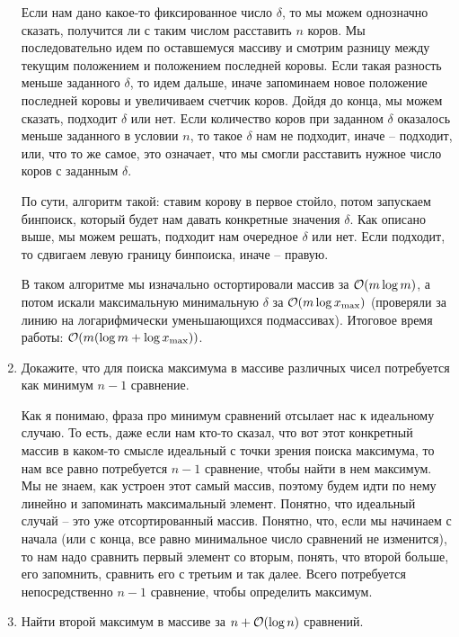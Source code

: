 \begin{enumerate}
\begin{solution}
		Если нам дано какое-то фиксированное число $\delta$, то мы можем однозначно сказать, получится ли с таким числом расставить $n$ коров. Мы последовательно идем по оставшемуся массиву и смотрим разницу между текущим положением и положением последней коровы. Если такая разность меньше заданного $\delta$, то идем дальше, иначе запоминаем новое положение последней коровы и увеличиваем счетчик коров. Дойдя до конца, мы можем сказать, подходит $\delta$ или нет. Если количество коров при заданном $\delta$ оказалось меньше заданного в условии $n$, то такое $\delta$ нам не подходит, иначе -- подходит, или, что то же самое, это означает, что мы смогли расставить нужное число коров с заданным $\delta$.

		По сути, алгоритм такой: ставим корову в первое стойло, потом запускаем бинпоиск, который будет нам давать конкретные значения $\delta$. Как описано выше, мы можем решать, подходит нам очередное $\delta$ или нет. Если подходит, то сдвигаем левую границу бинпоиска, иначе -- правую.

		В таком алгоритме мы изначально остортировали массив за $\mathcal{O}(m \log m)$, а потом искали максимальную минимальную $\delta$ за $\mathcal{O}(m \log{x_{\max}})$ (проверяли за линию на логарифмически уменьшающихся подмассивах). Итоговое время работы: $\mathcal{O}(m (\log{m} + \log{x_{\max}}))$.
	\end{solution}

  \item
    Докажите, что для поиска максимума в массиве различных чисел потребуется
	как минимум $n-1$ сравнение.
	\begin{solution}
		Как я понимаю, фраза про минимум сравнений отсылает нас к идеальному случаю. То есть, даже если нам кто-то сказал, что вот этот конкретный массив в каком-то смысле идеальный с точки зрения поиска максимума, то нам все равно потребуется $n - 1$ сравнение, чтобы найти в нем максимум. Мы не знаем, как устроен этот самый массив, поэтому будем идти по нему линейно и запоминать максимальный элемент. Понятно, что идеальный случай -- это уже отсортированный массив. Понятно, что, если мы начинаем с начала (или с конца, все равно минимальное число сравнений не изменится), то нам надо сравнить первый элемент со вторым, понять, что второй больше, его запомнить, сравнить его с третьим и так далее. Всего потребуется непосредственно $n - 1$ сравнение, чтобы определить максимум.
	\end{solution}
	

  \item
	Найти второй максимум в массиве за $n + \mathcal{O}(\log n)$ сравнений.	


\end{enumerate}
